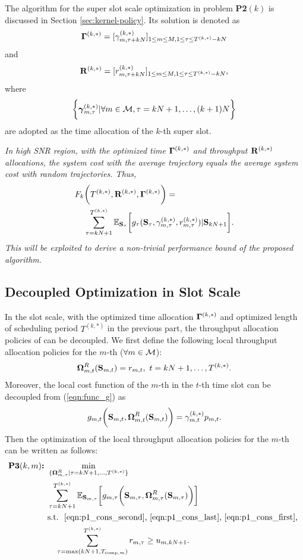 The  algorithm for the super slot scale optimization in problem \textbf{P2$(k)$} is discussed in Section \ref{sec:kernel-policy}.
Its solution is denoted as
$$\mathbf{\Gamma}^{(k,*)}=[\gamma^{(k,*)}_{m,\tau+kN}]_{1 \leq m \leq M, 1 \leq \tau \leq T^{(k,*)}-kN}$$
and
$$\mathbf{R}^{(k,*)}=[r^{(k,*)}_{m,\tau+kN}]_{1 \leq m \leq M, 1 \leq \tau \leq T^{(k,*)}-kN},$$
where $$\bigg\{ \boldsymbol{\gamma}^{(k,*)}_{m,\tau} | \forall m\in\mathcal{M}, \tau=kN+1,\dots,(k+1)N \bigg\}$$ are adopted as the time allocation of the $k$-th super slot.


 {\it In high SNR region, with the optimized time $\mathbf{\Gamma}^{(k,*)}$ and throughput $\mathbf{R}^{(k,*)}$ allocations, the system cost with the average trajectory equals the average system cost with random trajectories. Thus,
\begin{align*}
F_k &\bigg( T^{(k,*)}, \mathbf{R}^{(k,*)}, \mathbf{\Gamma}^{(k,*)}\bigg) =
\nonumber\\
&\sum_{\tau=kN+1}^{T^{(k,*)}} \mathbb{E}_{\mathbf{S}_{\tau}} \bigg[
            g_{\tau}( \mathbf{S}_{\tau}, \gamma^{(k,*)}_{m,\tau}, r^{(k,*)}_{m,\tau}) | \mathbf{S}_{kN+1}
        \bigg].
\end{align*}
This will be exploited to derive a non-trivial performance bound of the proposed algorithm.}

\subsection{Decoupled Optimization in Slot Scale}
In the slot scale, with the optimized time allocation $\mathbf{\Gamma}^{(k,*)}$ and optimized length of scheduling period $T^{(k,*)}$ in the previous part, the throughput allocation policies of {\IAVs} can be decoupled. We first define the following local throughput allocation policies for the $m$-th {\IAV} ($\forall m\in\mathcal{M}$):
\begin{align}
    \boldsymbol{\Omega}^{R}_{m,t}( \mathbf{S}_{m,t} ) = r_{m,t},~t=kN+1,\dots,T^{(k,*)}.
\end{align}
Moreover, the local cost function of the $m$-th {\IAV} in the $t$-th time slot can be decoupled from (\ref{eqn:func_g})  as
\begin{align}
    g_{m,t}\bigg( \mathbf{S}_{m,t}, \boldsymbol{\Omega}^{R}_{m,t}(\mathbf{S}_{m,t}) \bigg) = \gamma^{(k,*)}_{m,t} p_{m,t}.
\end{align}
Then the optimization of the local throughput allocation policies for the $m$-th {\IAV} can be written as follows:
\begin{align}
    \textbf{P3$(k,m)$:~}
    &\min_{ \{\boldsymbol{\Omega}^{R}_{m,\tau} | \tau=kN+1,\dots,T^{(k,*)} \} }
        \nonumber\\
        &\sum_{\tau=kN+1}^{T^{(k,*)}}
        \mathbb{E}_{\mathbf{S}_{m,\tau}} \bigg[
            g_{m,\tau}\bigg( \mathbf{S}_{m,\tau}, \boldsymbol{\Omega}^{R}_{m,\tau}( \mathbf{S}_{m,\tau} ) \bigg)\nonumber
        \bigg]
    \\\nonumber
    &\text{s.t.~} \text{ \eqref{eqn:p1_cons_second}, \eqref{eqn:p1_cons_last}, \eqref{eqn:p1_cons_first}, } \nonumber\\
    & ~~~ \sum_{ \tau=\max(kN+1,T_{\text{comp},m}) }^{ T^{(k,*)}} r_{m,\tau} \geq {u}_{m,kN+1}.
\end{align}

